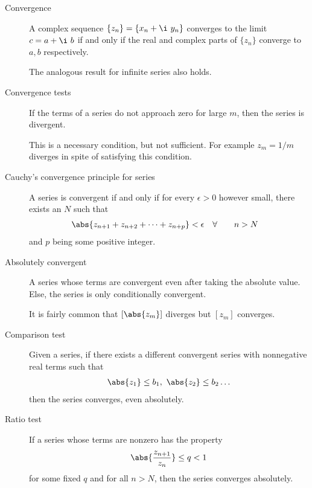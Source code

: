 \begin{description}
    \item[Convergence] A complex sequence $ \{z_n\} = \{x_n + \i\ y_n\} $ converges to
        the limit $ c = a + \i\ b $ if and only if the real and complex parts of
        $ \{z_n\} $ converge to $ a, b $ respectively. \par
        The analogous result for infinite series also holds.

    \item[Convergence tests] If the terms of a series do not approach zero for large
        $ m $, then the series is divergent. \par
        This is a necessary condition, but not sufficient. For example $ z_m = 1/m $
        diverges in spite of satisfying this condition.

    \item[Cauchy's convergence principle for series] A series is convergent if and only if
        for every $ \epsilon > 0 $ however small, there exists an $ N $ such that
        \begin{align}
            \abs{z_{n+1} + z_{n+2} + \dots + z_{n+p}} & < \epsilon &
            \forall \qquad n                          & > N
        \end{align}
        and $ p $ being some positive integer.

    \item[Absolutely convergent] A series whose terms are convergent even after taking
        the absolute value. Else, the series is only conditionally convergent. \par
        It is fairly common that $ [\abs{z_m}] $ diverges but $ [z_m] $ converges.

    \item[Comparison test] Given a series, if there exists a different convergent series
        with nonnegative real terms such that
        \begin{align}
            \abs{z_1} \leq b_1,\ \abs{z_2} \leq b_2 \dots
        \end{align}
        then the series converges, even absolutely.

    \item[Ratio test] If a series whose terms are nonzero has the property
        \begin{align}
            \abs{\frac{z_{n+1}}{z_n}} \leq q < 1
        \end{align}
        for some fixed $ q $ and for all $ n > N $, then the series converges
        absolutely.


\end{description}
